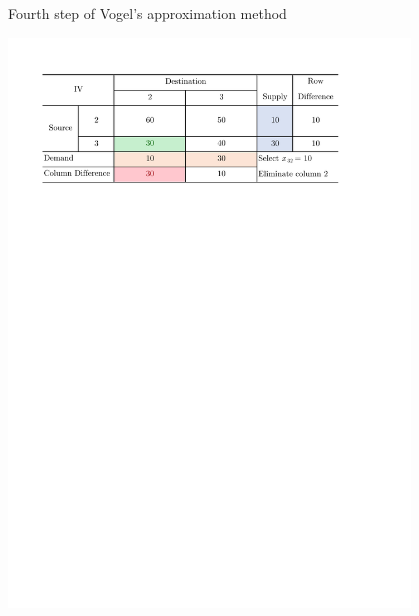 \documentclass[a4paper]{article}
\begin{document}
\begin{enumerate}
\begin{enumerate}
\begin{solution}
	\begin{table}[H]
		\caption{Fourth step of Vogel's approximation method}
		\label{tabVO4}
		\centering
		\includegraphics[width = 0.8\textwidth]{VO4}				
	\end{table}


\end{solution}
\end{enumerate}
\end{enumerate}
\end{document}
